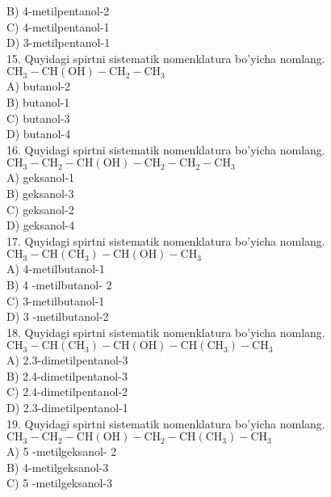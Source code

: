 B) 4-metilpentanol-2\\
C) 4-metilpentanol-1\\
D) 3-metilpentanol-1\\
15. Quyidagi spirtni sistematik nomenklatura bo'yicha nomlang.\\
$\mathrm{CH}_{3}-\mathrm{CH}(\mathrm{OH})-\mathrm{CH}_{2}-\mathrm{CH}_{3}$\\
A) butanol-2\\
B) butanol-1\\
C) butanol-3\\
D) butanol-4\\
16. Quyidagi spirtni sistematik nomenklatura bo'yicha nomlang.\\
$\mathrm{CH}_{3}-\mathrm{CH}_{2}-\mathrm{CH}(\mathrm{OH})-\mathrm{CH}_{2}-\mathrm{CH}_{2}-\mathrm{CH}_{3}$\\
A) geksanol-1\\
B) geksanol-3\\
C) geksanol-2\\
D) geksanol-4\\
17. Quyidagi spirtni sistematik nomenklatura bo'yicha nomlang.\\
$\mathrm{CH}_{3}-\mathrm{CH}\left(\mathrm{CH}_{3}\right)-\mathrm{CH}(\mathrm{OH})-\mathrm{CH}_{3}$\\
A) 4-metilbutanol-1\\
B) 4 -metilbutanol- 2\\
C) 3-metilbutanol-1\\
D) 3 -metilbutanol-2\\
18. Quyidagi spirtni sistematik nomenklatura bo'yicha nomlang.\\
$\mathrm{CH}_{3}-\mathrm{CH}\left(\mathrm{CH}_{3}\right)-\mathrm{CH}(\mathrm{OH})-\mathrm{CH}\left(\mathrm{CH}_{3}\right)-\mathrm{CH}_{3}$\\
A) 2.3-dimetilpentanol-3\\
B) 2.4-dimetilpentanol-3\\
C) 2.4-dimetilpentanol-2\\
D) 2.3-dimetilpentanol-1\\
19. Quyidagi spirtni sistematik nomenklatura bo'yicha nomlang.\\
$\mathrm{CH}_{3}-\mathrm{CH}_{2}-\mathrm{CH}(\mathrm{OH})-\mathrm{CH}_{2}-\mathrm{CH}\left(\mathrm{CH}_{3}\right)-\mathrm{CH}_{3}$\\
A) 5 -metilgeksanol- 2\\
B) 4-metilgeksanol-3\\
C) 5 -metilgeksanol-3\\
